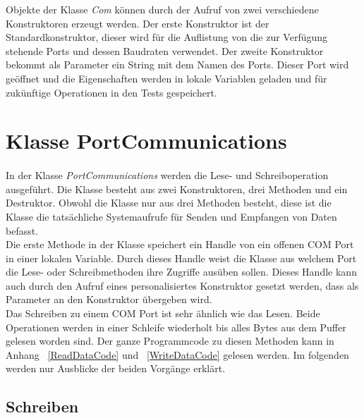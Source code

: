 Objekte der Klasse \textit{Com} können durch der Aufruf von zwei verschiedene Konstruktoren erzeugt werden. Der erste Konstruktor ist der Standardkonstruktor, dieser wird für die Auflistung von die zur Verfügung stehende Ports und dessen Baudraten verwendet. Der zweite Konstruktor bekommt als Parameter ein String mit dem Namen des Ports. Dieser Port wird geöffnet und die Eigenschaften werden in lokale Variablen geladen und  für zukünftige Operationen in den Tests gespeichert.
 
\newpage


\section{Klasse PortCommunications}\label{PortCommClass}
\paragraph{}
In der Klasse \textit{PortCommunications} werden die Lese- und Schreiboperation ausgeführt. Die Klasse besteht aus zwei Konstruktoren, drei Methoden und ein Destruktor. Obwohl die Klasse nur aus drei Methoden besteht, diese ist die Klasse die tatsächliche Systemaufrufe für Senden und Empfangen von Daten befasst.\\

Die erste Methode in der Klasse speichert ein Handle von ein offenen COM Port in einer lokalen Variable. Durch dieses Handle weist die Klasse aus welchem Port die Lese- oder Schreibmethoden ihre Zugriffe ausüben sollen. Dieses Handle kann auch durch den Aufruf eines personalisiertes Konstruktor gesetzt werden, dass als Parameter an den Konstruktor übergeben wird.\\

Das Schreiben zu einem COM Port ist sehr ähnlich wie das Lesen. Beide Operationen werden in einer Schleife wiederholt bis alles Bytes aus dem Puffer gelesen worden sind. Der ganze Programmcode zu diesen Methoden kann in Anhang ~\ref{ReadDataCode} und ~\ref{WriteDataCode} gelesen werden. Im folgenden werden nur Ausblicke der beiden Vorgänge erklärt.\\

\subsection{Schreiben}
